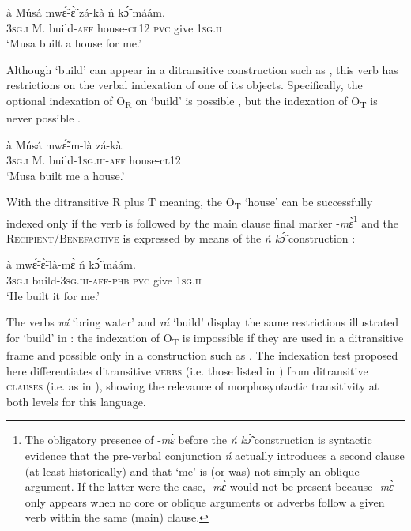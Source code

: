 \documentclass[output=paper]{langsci/langscibook}
\begin{document}
\ea
\label{ex:6.pacchiarotti}
\gll à    Músá  mwɛ̃́-ɛ̃̀    zá-kà    ń  kɔ̃́  máám. \\
\textsc{3sg.i}    M.  build-\textsc{aff}  house\textsc{-cl12}  \textsc{pvc}  give  \textsc{1sg.ii}\\
\glt`Musa built a house for me.'
\z

Although `build' can appear in a ditransitive construction such as , this verb has restrictions on the verbal indexation of one of its objects. Specifically, the optional indexation of O\textsubscript{R} on `build' is possible , but the indexation of O\textsubscript{T} is never possible .

\ea
\label{ex:7.pacchiarotti}
\gll à    Músá  mwɛ̃́-m-là    zá-kà.\\
\textsc{3sg.i}    M.  build-\textsc{1sg.iii-aff}  house-c\textsc{l12}\\
\glt `Musa built me a house.'
\z
 
\z


With the ditransitive R plus T meaning, the O\textsubscript{T} `house' can be successfully indexed only if the verb is followed by the main clause final marker -\textit{m\`{ɛ}}\footnote{The obligatory presence of -\textit{m\`{ɛ}} before the \textit{ń k\'{\~{ɔ}}} construction is syntactic evidence that the pre-verbal conjunction \textit{ń} actually introduces a second clause (at least historically) and that `me' is (or was) not simply an oblique argument. If the latter were the case, -\textit{m\`{ɛ}} would not be present because -\textit{m\`{ɛ}} only appears when no core or oblique arguments or adverbs follow a given verb within the same (main) clause.}{} and the \textsc{Recipient/Bene\-factive} is expressed by means of the \textit{ń k\'{\~{ɔ}}} construction :

\ea
\label{ex:9.pacchiarotti}
\gll à    mwɛ̃́-ɛ̃̀-là-mɛ̀      ń  kɔ̃́  máám. \\
\textsc{3sg.i}    build-\textsc{3sg.iii-aff-phb}  \textsc{pvc}  give \textsc{  1sg.ii} \\
\glt `He built it for me.'
\z

The verbs \textit{wí} `bring water' and \textit{rá} `build' display the same restrictions illustrated for `build' in : the indexation of O\textsubscript{T} is impossible if they are used in a ditransitive frame and possible only in a construction such as . The indexation test proposed here differentiates ditransitive \textsc{verbs} (i.e. those listed in ) from ditransitive \textsc{clauses} (i.e. as in ), showing the relevance of morphosyntactic transitivity at both levels for this language.
\end{document}
